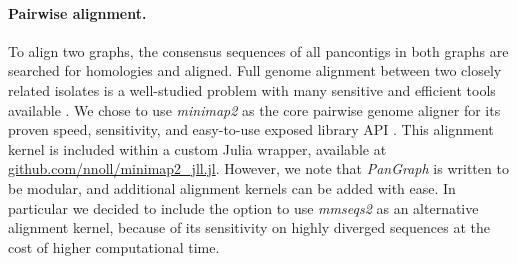 \documentclass[aps,rmp,preprint,superscriptaddress,10pt,linenumbers]{revtex4-1}
\begin{document}
\paragraph*{Pairwise alignment.}
To align two graphs, the consensus sequences of all pancontigs in both graphs are searched for homologies and aligned.
Full genome alignment between two closely related isolates is a well-studied problem with many sensitive and efficient tools available \cite{li2018minimap2,marccais2018mummer4}.
We chose to use \emph{minimap2} as the core pairwise genome aligner for its proven speed, sensitivity, and easy-to-use exposed library API \cite{li2018minimap2}.
This alignment kernel is included within a custom Julia wrapper, available at \url{github.com/nnoll/minimap2_jll.jl}.
However, we note that \emph{PanGraph} is written to be modular, and additional alignment kernels can be added with ease.
In particular we decided to include the option to use \emph{mmseqs2} \cite{steinegger2017mmseqs2} as an alternative alignment kernel, because of its sensitivity on highly diverged sequences at the cost of higher computational time.
\end{document}
